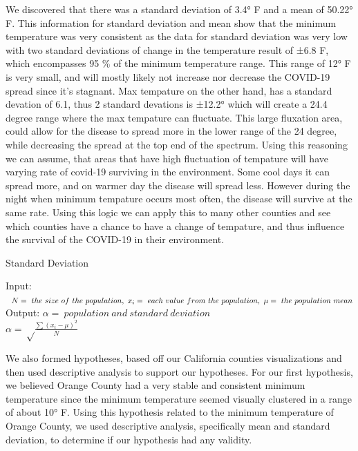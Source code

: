 \documentclass[10pt,journal,compsoc]{IEEEtran}
\begin{document}
{{	We discovered that there was a standard deviation of 3.4° F and a mean of 50.22° F. This information for standard deviation and mean show that the minimum temperature was very consistent as the data for standard deviation was very low with two standard deviations of change in the temperature result of ±6.8 F, which encompasses 95 \% of the minimum temperature range. This range of 12° F is very small, and will mostly likely not increase nor decrease the COVID-19 spread since it's stagnant. Max tempature on the other hand, has a standard devation of 6.1, thus 2 standard devations is ±12.2° which will create a 24.4 degree range where the max tempature can fluctuate. This large fluxation area, could allow for the disease to spread more in the lower range of the 24 degree, while decreasing the spread at the top end of the spectrum. Using this reasoning we can assume, that areas that have high fluctuation of tempature will have varying rate of covid-19 surviving in the environment. Some cool days it can spread more, and on warmer day the disease will spread less. However during the night when minimum tempature occurs most often, the disease will survive at the same rate. Using this logic we can apply this to many other counties and see which counties have a chance to have a change of tempature, and thus influence the survival of the COVID-19 in their environment. 

{\SetAlgoNoLine
	\begin{algorithm}
		\caption{Standard Deviation}
		\label{Algo: Calculate Standard Deviation:BWLP}
		Input: $\ 
		\ N = \ the \ size \ of \ the \ population, \newline
		\ x_i = \ each \ value \ from \ the \ population, \newline
		\ \mu = \ the \ population \ mean
		$\\
		Output: $  \alpha = \ population \ and \ standard \ deviation $\\
			
$ 			 	 \alpha = \sqrt\frac{\sum (x_i - \mu)^2}{N} $
	\end{algorithm}

	 We also formed hypotheses, based off our California counties visualizations and then used descriptive analysis to support our hypotheses. For our first hypothesis, we believed Orange County had a very stable and consistent minimum temperature since the minimum temperature seemed visually clustered in a range of about 10° F. Using this hypothesis related to the minimum temperature of Orange County, we used descriptive analysis, specifically mean and standard deviation, to determine if our hypothesis had any validity.
	
}}}
\end{document}
